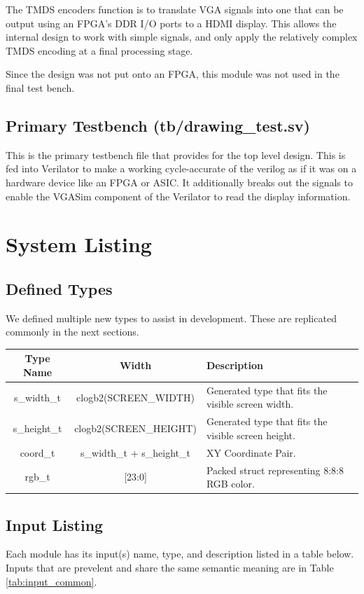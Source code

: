 \documentclass[12pt]{article}
\begin{document}
The TMDS encoders function is to translate VGA signals into one that can be
output using an FPGA's DDR I/O ports to a HDMI display. This allows the internal
design to work with simple signals, and only apply the relatively complex TMDS
encoding at a final processing stage.

Since the design was not put onto an FPGA, this module was not used in the final
test bench.

\subsection{Primary Testbench (tb/drawing\_test.sv)}
This is the primary testbench file that provides for the top level design. This
is fed into Verilator to make a working cycle-accurate of the verilog as if it
was on a hardware device like an FPGA or ASIC. It additionally breaks out the
signals to enable the VGASim component of the Verilator to read the display information.

\section{System Listing}
\subsection{Defined Types}

We defined multiple new types to assist in development. These are replicated
commonly in the next sections.

\begingroup
{}
\begin{tabularx}{\linewidth}{ ||c|c|X|| }
    \hline
    Type Name   & Width     & Description \\
    \hline
    s\_width\_t & clogb2(SCREEN\_WIDTH) & Generated type that fits the visible
    screen width. \\
    s\_height\_t & clogb2(SCREEN\_HEIGHT)  & Generated type that fits the visible
    screen height. \\
    coord\_t     &  s\_width\_t + s\_height\_t & XY Coordinate Pair. \\
    rgb\_t      & [23:0]    & Packed struct representing 8:8:8 RGB color. \\
    \hline
\end{tabularx}
\endgroup

\newpage
\subsection{Input Listing}
Each module has its input(s) name, type, and description listed in a table
below. Inputs that are prevelent and share the same semantic meaning are in Table
\ref{tab:input_common}.
\end{document}
